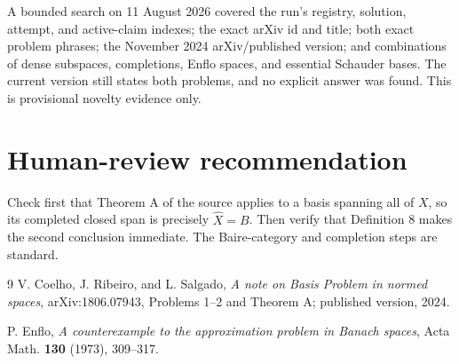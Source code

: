 \documentclass[11pt]{article}
\begin{document}
A bounded search on 11 August 2026 covered the run's registry, solution,
attempt, and active-claim indexes; the exact arXiv id and title; both exact
problem phrases; the November 2024 arXiv/published version; and combinations
of dense subspaces, completions, Enflo spaces, and essential Schauder bases.
The current version still states both problems, and no explicit answer was
found. This is provisional novelty evidence only.

\section*{Human-review recommendation}

Check first that Theorem A of the source applies to a basis spanning all of
$X$, so its completed closed span is precisely $\widehat X=B$. Then verify
that Definition 8 makes the second conclusion immediate. The Baire-category
and completion steps are standard.

\enlargethispage{4\baselineskip}
\begin{thebibliography}{9}
V. Coelho, J. Ribeiro, and L. Salgado,
\emph{A note on Basis Problem in normed spaces}, arXiv:1806.07943,
Problems 1--2 and Theorem A; published version, 2024.

P. Enflo,
\emph{A counterexample to the approximation problem in Banach spaces},
Acta Math. \textbf{130} (1973), 309--317.
\end{thebibliography}
\end{document}
